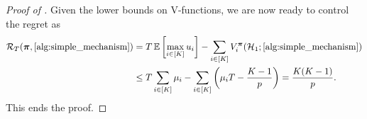 \begin{proof}[Proof of ]
Given the lower bounds on V-functions, we are now ready to control the regret as
\begin{align*}
\mathcal R_T(\bm \pi,\text{\Cref{alg:simple_mechanism}}) &= T\E\sqb{\max_{i\in[K]}u_i} - \sum_{i\in[K]}V_i^{\bm\pi}(\mH_1;\text{\Cref{alg:simple_mechanism}}) \\ &\le T\sum_{i\in[K]}\mu_i -\sum_{i\in[K]}\left (\mu_i T - \frac{K-1}{p}\right ) = \frac{K(K-1)}{p}.
\end{align*}
This ends the proof.
\end{proof}
